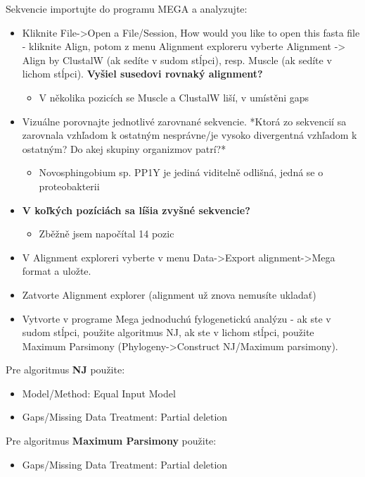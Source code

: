 \documentclass[11pt]{article}
\begin{document}
Sekvencie importujte do programu MEGA a analyzujte:
\begin{itemize}
\item Kliknite File->Open a File/Session, How would you like to open this fasta
file - kliknite Align, potom z menu Alignment exploreru vyberte Alignment ->
Align by ClustalW (ak sedíte v sudom stĺpci), resp. Muscle (ak sedíte v lichom
stĺpci). \textbf{Vyšiel susedovi rovnaký alignment?}
\begin{itemize}
\item V několika pozicích se Muscle a ClustalW liší, v umístěni gaps
\end{itemize}
\item Vizuálne porovnajte jednotlivé zarovnané sekvencie. *Ktorá zo
sekvencií sa zarovnala vzhľadom k ostatným nesprávne/je vysoko
divergentná vzhľadom k ostatným? Do akej skupiny organizmov patrí?*
\begin{itemize}
\item Novosphingobium sp. PP1Y je jediná viditelně odlišná, jedná se o proteobakterii
\end{itemize}
\item \textbf{V koľkých pozíciách sa líšia zvyšné sekvencie?}
\begin{itemize}
\item Zběžně jsem napočítal 14 pozic
\end{itemize}
\item V Alignment exploreri vyberte v menu Data->Export alignment->Mega
format a uložte.
\item Zatvorte Alignment explorer (alignment už znova nemusíte ukladať)
\item Vytvorte v programe Mega jednoduchú fylogenetickú analýzu - ak ste
v sudom stĺpci, použite algoritmus NJ, ak ste v lichom stĺpci,
použite Maximum Parsimony (Phylogeny->Construct NJ/Maximum
parsimony).
\end{itemize}

Pre algoritmus \textbf{NJ} použite:
\begin{itemize}
\item Model/Method: Equal Input Model
\item Gaps/Missing Data Treatment: Partial deletion
\end{itemize}

Pre algoritmus \textbf{Maximum Parsimony} použite:
\begin{itemize}
\item Gaps/Missing Data Treatment: Partial deletion
\end{itemize}
\end{document}
